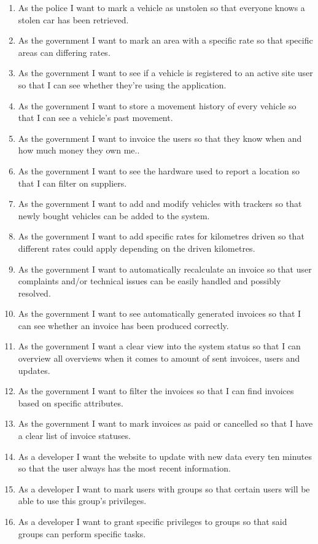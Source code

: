 \begin{enumerate}
	\item As the police I want to mark a vehicle as unstolen so that everyone knows a stolen car has been retrieved.
	\item As the government I want to mark an area with a specific rate so that specific areas can differing rates.
	\item As the government I want to see if a vehicle is registered to an active site user so that I can see whether they’re using the application.
	\item As the government I want to store a movement history of every vehicle so that I can see a vehicle’s past movement.
	\item As the government I want to invoice the users so that they know when and how much money they own me..
	\item As the government I want to see the hardware used to report a location so that I can filter on suppliers.
	\item As the government I want to add and modify vehicles with trackers so that newly bought vehicles can be added to the system.
	\item As the government I want to add specific rates for kilometres driven so that different rates could apply depending on the driven kilometres.
	\item As the government I want to automatically recalculate an invoice so that user complaints and/or technical issues can be easily handled and possibly resolved.
	\item As the government I want to see automatically generated invoices so that I can see whether an invoice has been produced correctly.
	\item As the government I want a clear view into the system status so that I can overview all overviews when it comes to amount of sent invoices, users and updates.
	\item As the government I want to filter the invoices so that I can find invoices based on specific attributes.
	\item As the government I want to mark invoices as paid or cancelled so that I have a clear list of invoice statuses.
	\item As a developer I want the website to update with new data every ten minutes so that the user always has the most recent information.
	\item As a developer I want to mark users with groups so that certain users will be able to use this group’s privileges.
	\item As a developer I want to grant specific privileges to groups so that said groups can perform specific tasks.

\end{enumerate}
